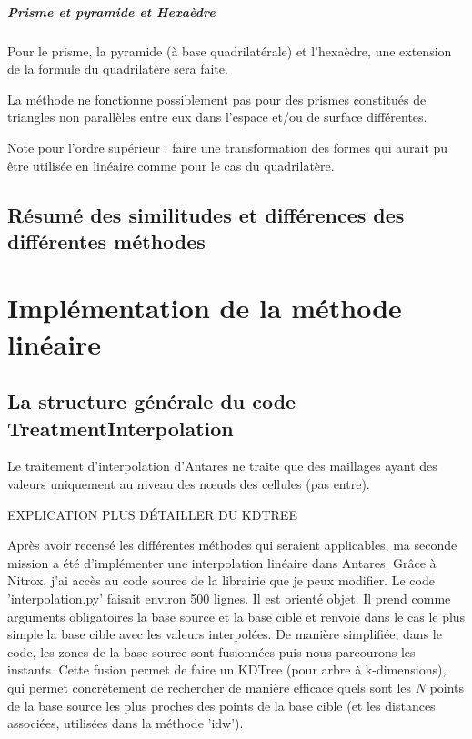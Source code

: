 \subparagraph{Prisme et pyramide et Hexaèdre}

Pour le prisme, la pyramide (à base quadrilatérale) et l’hexaèdre, une extension de la formule du quadrilatère sera faite.


La méthode ne fonctionne possiblement pas pour des prismes constitués de triangles non parallèles entre eux dans l'espace et/ou de surface différentes.


Note pour l'ordre supérieur : faire une transformation des formes qui aurait pu être utilisée en linéaire comme pour le cas du quadrilatère. \cite{camarero2024}



\subsection{Résumé des similitudes et différences des différentes méthodes}



\section{Implémentation de la méthode linéaire}

\subsection{La structure générale du code TreatmentInterpolation}

Le traitement d'interpolation d'Antares ne traite que des maillages ayant des valeurs uniquement au niveau des nœuds des cellules (pas entre).

EXPLICATION PLUS DÉTAILLER DU KDTREE

Après avoir recensé les différentes méthodes qui seraient applicables, ma seconde mission a été d'implémenter une interpolation linéaire dans Antares. Grâce à Nitrox, j'ai accès au code source de la librairie que je peux modifier. Le code 'interpolation.py' faisait environ 500 lignes. Il est orienté objet. Il prend comme arguments obligatoires la base source et la base cible et renvoie dans le cas le plus simple la base cible avec les valeurs interpolées.
De manière simplifiée, dans le code, les zones de la base source sont fusionnées puis nous parcourons les instants. 
Cette fusion permet de faire un KDTree (pour arbre à k-dimensions), qui permet concrètement de rechercher de manière efficace quels sont les \( N \) points de la base source les plus proches des points de la base cible (et les distances associées, utilisées dans la méthode 'idw').

